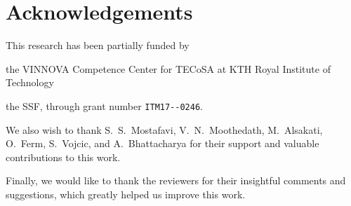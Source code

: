 \section*{Acknowledgements}\label{paper:olguinmunoz2022cleave:acks}

This research has been partially funded by
\begin{enumerate*}[itemjoin={{; }}, itemjoin*={{; and }}, label={(\arabic*)}]
    \item the VINNOVA Competence Center for \gls{TECoSA} at KTH Royal Institute of Technology
    \item the \gls{SSF}, through grant number \verb|ITM17--0246|.
\end{enumerate*}

We also wish to thank S.~S.~Mostafavi, V.~N.~Moothedath, M.~Alsakati, O.~Ferm, S.~Vojcic, and A.~Bhattacharya for their support and valuable contributions to this work.

Finally, we would like to thank the reviewers for their insightful comments and suggestions, which greatly helped us improve this work.
